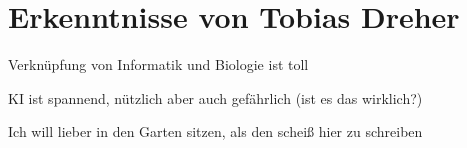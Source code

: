 \section{Erkenntnisse von Tobias Dreher}
Verknüpfung von Informatik und Biologie ist toll

KI ist spannend, nützlich aber auch gefährlich (ist es das wirklich?)

Ich will lieber in den Garten sitzen, als den scheiß hier zu schreiben
